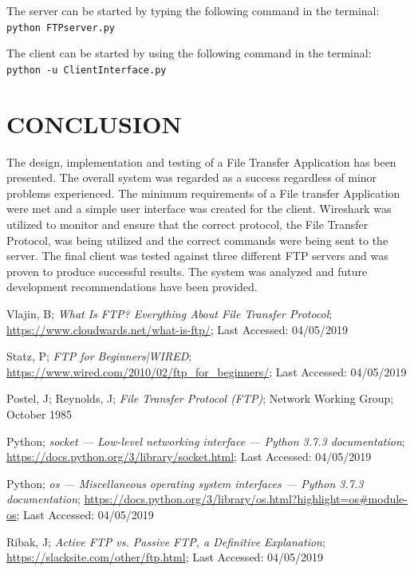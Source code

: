 \documentclass[10pt,twocolumn]{witseiepaper}
\def\code#1{\texttt{#1}}
\begin{document}
The server can be started by typing the following command in the terminal:
\code{python FTPserver.py}

The client can be started by using the following command in the terminal:
\code{python -u ClientInterface.py}

%
\section{CONCLUSION}
\label{sec: Conclusion}
The design, implementation and testing of a File Transfer Application has been presented. The overall system was regarded as a success regardless of minor problems experienced. The minimum requirements of a File transfer Application were met and a simple user interface was created for the client. Wireshark was utilized to monitor and ensure that the correct protocol, the File Transfer Protocol, was being utilized and the correct commands were being sent to the server. The final client was tested against three different FTP servers and was proven to produce successful results. The system was analyzed and future development recommendations have been provided.


%
\begin{thebibliography}{}


Vlajin, B; \emph{What Is FTP? Everything About File Transfer Protocol}; \url{https://www.cloudwards.net/what-is-ftp/}; Last Accessed: 04/05/2019

Statz, P; \emph{FTP for Beginners|WIRED}; \url{https://www.wired.com/2010/02/ftp_for_beginners/}; Last Accessed: 04/05/2019

Postel, J; Reynolds, J; \emph{File Transfer Protocol (FTP)}; Network Working Group; October 1985

Python; \emph{socket — Low-level networking interface — Python 3.7.3 documentation}; \url{https://docs.python.org/3/library/socket.html}; Last Accessed: 04/05/2019

Python; \emph{os — Miscellaneous operating system interfaces — Python 3.7.3 documentation}; \url{https://docs.python.org/3/library/os.html?highlight=os#module-os}; Last Accessed: 04/05/2019

Ribak, J; \emph{Active FTP vs. Passive FTP, a Definitive Explanation}; \url{https://slacksite.com/other/ftp.html}; Last Accessed: 04/05/2019

\end{thebibliography}
\end{document}
